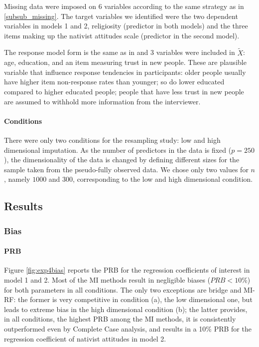 	Missing data were imposed on 6 variables according to the same strategy as in \ref{subsub_missing}.
	The target variables we identified were the two dependent variables in models 1 and 2, religiosity (predictor
	in both models) and the three items making up the nativist attitudes scale (predictor in the second model).

	The response model form is the same as in \label{eqn:rm} and 3 variables were included in $\tilde{X}$: 
	age, education, and an item measuring trust in new people. 
	These are plausible variable that influence response tendencies in participants: 
	older people usually have higher item non-response rates than younger;
	so do lower educated compared to higher educated people; 
	people that have less trust in new people are assumed to withhold more information from the interviewer.

\paragraph{Conditions}
	There were only two conditions for the resampling study: low and high dimensional imputation.
	As the number of predictors in the data is fixed ($p = 250$), the dimensionality of the data is
	changed by defining different sizes for the sample taken from the pseudo-fully observed data.
	We chose only two values for $n$, namely $1000$ and $300$, corresponding to the low and high 
	dimensional condition.

\subsection{Results}
\subsubsection{Bias}

	\paragraph{PRB}
	Figure \ref{fig:exp4bias} reports the PRB for the regression coefficients of interest in model 1 and 2.
	Most of the MI methods result in negligible biases ($PRB < 10\%$) for both parameters in all conditions.
	The only two exceptions are bridge and MI-RF: the former is very competitive in condition (a), the low
	dimensional one, but leads to extreme bias in the high dimensional condition (b); the latter provides, 
	in all conditions, the highest PRB among the MI methods, it is consistently outperformed even by
	Complete Case analysis, and results in a 10\% PRB for the regression coefficient of nativist attitudes 
	in model 2.

